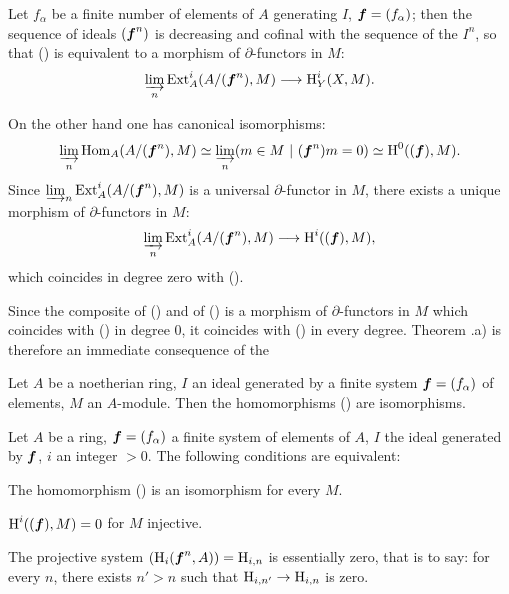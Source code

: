 Let $f_{\alpha}$ be a finite number of elements of $A$ generating $I$, $\boldsymbol{f}=(f_{\alpha})$; then the sequence of ideals $(\boldsymbol{f}^n)$ is decreasing and cofinal with the sequence of the $I^n$, so that () is equivalent to a morphism of $\partial$-functors in $M$:
\begin{equation} \label{eq:II.7.4} \varinjlim_{n} \Ext_A^i(A/(\bbf^n), M) \to \H_Y^i(X, M).
\end{equation}

On the other hand one has canonical isomorphisms:
\begin{equation} \label{eq:II.7.5} \varinjlim_{n} \operatorname{Hom}_A(A/(\boldsymbol{f}^n), M) \simeq \varinjlim_{n} (m\in M\ |\ (\boldsymbol{f}^n)m=0) \simeq \operatorname{H}^0((\boldsymbol{f}), M).
\end{equation}
Since $\varinjlim_{n} \operatorname{Ext}_A^i(A/(\boldsymbol{f}^n), M)$ is a universal $\partial$-functor in $M$, there exists a unique morphism of $\partial$-functors in $M$:
\begin{equation} \label{eq:II.7.6} \varinjlim_{n} \Ext_A^i(A/(\bbf^n), M) \to \H^i((\bbf), M),
\end{equation}
which coincides in degree zero with ().

Since the composite of () and of () is a morphism of $\partial$-functors in $M$ which coincides with () in degree $0$, it coincides with () in every degree. Theorem .a) is therefore an immediate consequence of the

\begin{suplemma} \label{II.8}
Let $A$ be a noetherian ring, $I$ an ideal generated by a finite system $\boldsymbol{f}=(f_{\alpha})$ of elements, $M$ an $A$-module. Then the homomorphisms () are isomorphisms.
\end{suplemma}

\begin{suplemma} \label{II.9}
Let $A$ be a ring, $\boldsymbol{f}=(f_{\alpha})$ a finite system of elements of $A$, $I$ the ideal generated by $\boldsymbol{f}$, $i$ an integer $>0$. The following conditions are equivalent:
\begin{enumeratea}
\item
The homomorphism () is an isomorphism for every $M$.
\item
$\operatorname{H}^i((\boldsymbol{f}), M)=0$ for $M$ injective.
\item
The projective system $(\operatorname{H}_i(\boldsymbol{f}^n, A))=\operatorname{H}_{i, n}$ is essentially zero, that is to say: for every $n$, there exists $n'>n$ such that $\H_{i, n'}\to\H_{i, n}$ is zero.
\end{enumeratea}
\end{suplemma}

